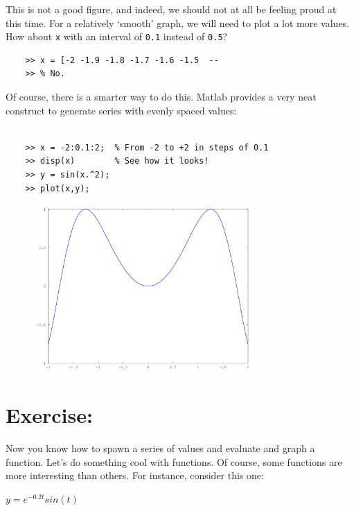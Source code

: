 \documentclass{article}
\begin{document}
This is not a good figure, and indeed, we should not at all
be feeling proud at this time. For a relatively `smooth' graph,
we will need to plot a lot more values. How about \texttt{x}
with an interval of \texttt{0.1} instead of \texttt{0.5}?

\begin{verbatim}
    >> x = [-2 -1.9 -1.8 -1.7 -1.6 -1.5  --
    >> % No.
\end{verbatim}

Of course, there is a smarter way to do this. Matlab 
provides a very neat construct to generate series with
evenly spaced values:

\begin{verbatim}
    
    >> x = -2:0.1:2;  % From -2 to +2 in steps of 0.1
    >> disp(x)        % See how it looks!
    >> y = sin(x.^2);
    >> plot(x,y);

\end{verbatim}

\begin{figure}[h]
\begin{center}
\includegraphics[height=180pt]{figures/fine.png}
\end{center}
\end{figure}

\section*{Exercise: }

Now you know how to spawn a series of values and evaluate and graph a 
function. Let's do something cool with functions. Of course, some functions 
are more interesting than others. For instance, consider this one:

\begin{center}
$y = e^{-0.2t}sin(t)$
\end{center}
\end{document}
